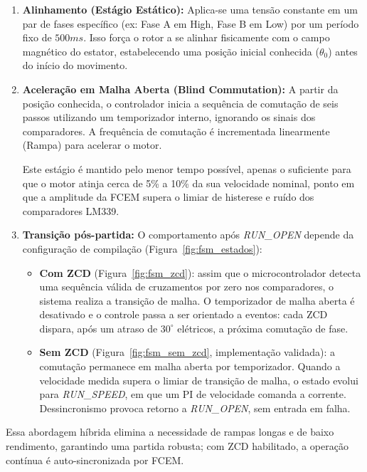 \begin{enumerate}
    \item \textbf{Alinhamento (Estágio Estático):} 
    Aplica-se uma tensão constante em um par de fases específico (ex: Fase A em High, Fase B em Low) por um período fixo de $500ms$. Isso força o rotor a se alinhar fisicamente com o campo magnético do estator, estabelecendo uma posição inicial conhecida ($\theta_0$) antes do início do movimento.
    
    \item \textbf{Aceleração em Malha Aberta (Blind Commutation):} 
    A partir da posição conhecida, o controlador inicia a sequência de comutação de seis passos utilizando um temporizador interno, ignorando os sinais dos comparadores. A frequência de comutação é incrementada linearmente (Rampa) para acelerar o motor.
    
    Este estágio é mantido pelo menor tempo possível, apenas o suficiente para que o motor atinja cerca de 5\% a 10\% da sua velocidade nominal, ponto em que a amplitude da FCEM supera o limiar de histerese e ruído dos comparadores LM339.
    
    \item \textbf{Transição pós-partida:} 
    O comportamento após \textit{RUN\_OPEN} depende da configuração de compilação (Figura~\ref{fig:fsm_estados}):
    \begin{itemize}
        \item \textbf{Com ZCD} (Figura~\ref{fig:fsm_zcd}): assim que o microcontrolador detecta uma sequência válida de cruzamentos por zero nos comparadores, o sistema realiza a transição de malha. O temporizador de malha aberta é desativado e o controle passa a ser orientado a eventos: cada ZCD dispara, após um atraso de $30^\circ$ elétricos, a próxima comutação de fase.
        \item \textbf{Sem ZCD} (Figura~\ref{fig:fsm_sem_zcd}, implementação validada): a comutação permanece em malha aberta por temporizador. Quando a velocidade medida supera o limiar de transição de malha, o estado evolui para \textit{RUN\_SPEED}, em que um PI de velocidade comanda a corrente. Dessincronismo provoca retorno a \textit{RUN\_OPEN}, sem entrada em falha.
    \end{itemize}
\end{enumerate}

Essa abordagem híbrida elimina a necessidade de rampas longas e de baixo rendimento, garantindo uma partida robusta; com ZCD habilitado, a operação contínua é auto-sincronizada por FCEM.

